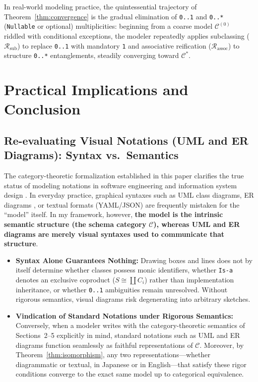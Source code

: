 \documentclass[11pt,a4paper]{article}
\theoremstyle{definition}
\theoremstyle{plain}
\theoremstyle{remark}
\newcommand{\Rsub}{\mathcal{R}_{\mathrm{sub}}}
\newcommand{\Rassoc}{\mathcal{R}_{\mathrm{assoc}}}
\begin{document}
In real-world modeling practice, the quintessential trajectory of Theorem~\ref{thm:convergence} is the gradual elimination of \texttt{0..1} and \texttt{0..*} (\texttt{Nullable} or optional) multiplicities: beginning from a coarse model $\mathcal{C}^{(0)}$ riddled with conditional exceptions, the modeler repeatedly applies subclassing ($\Rsub$) to replace \texttt{0..1} with mandatory \texttt{1} and associative reification ($\Rassoc$) to structure \texttt{0..*} entanglements, steadily converging toward $\mathcal{C}^*$.

\section{Practical Implications and Conclusion}

\subsection{Re-evaluating Visual Notations (UML and ER Diagrams): Syntax vs.\ Semantics}
The category-theoretic formalization established in this paper clarifies the true status of modeling notations in software engineering and information system design \cite{shlaer1988,shlaer1992,mellor2002}. In everyday practice, graphical syntaxes such as UML class diagrams, ER diagrams \cite{chen1976}, or textual formats (YAML/JSON) are frequently mistaken for the ``model'' itself. In my framework, however, \textbf{the model is the intrinsic semantic structure (the schema category $\mathcal{C}$), whereas UML and ER diagrams are merely visual syntaxes used to communicate that structure}.

\begin{itemize}
    \item \textbf{Syntax Alone Guarantees Nothing:} Drawing boxes and lines does not by itself determine whether classes possess monic identifiers, whether \texttt{Is-a} denotes an exclusive coproduct ($S \cong \coprod C_i$) rather than implementation inheritance, or whether \texttt{0..1} ambiguities remain unresolved. Without rigorous semantics, visual diagrams risk degenerating into arbitrary sketches.
    \item \textbf{Vindication of Standard Notations under Rigorous Semantics:} Conversely, when a modeler writes with the category-theoretic semantics of Sections~2--5 explicitly in mind, standard notations such as UML and ER diagrams function seamlessly as faithful representations of $\mathcal{C}$. Moreover, by Theorem~\ref{thm:isomorphism}, any two representations---whether diagrammatic or textual, in Japanese or in English---that satisfy these rigor conditions converge to the exact same model up to categorical equivalence.
\end{itemize}
\end{document}
